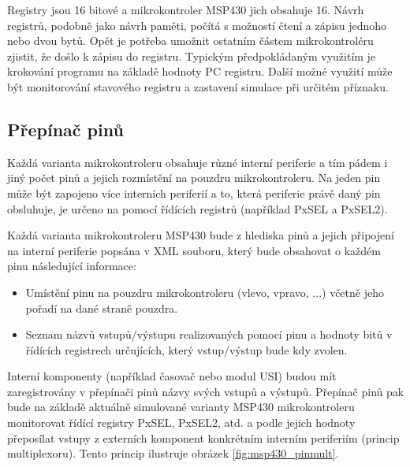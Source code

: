 Registry jsou 16 bitové a mikrokontroler MSP430 jich obsahuje 16. Návrh registrů, podobně jako návrh paměti, počítá s možností čtení a zápisu jednoho nebo dvou bytů. Opět je potřeba umožnit ostatním částem mikrokontroléru zjistit, že došlo k zápisu do registru. Typickým předpokládaným využitím je krokování
programu na základě hodnoty PC registru. Další možné využití může být monitorování stavového registru a zastavení simulace při určitém příznaku.

\subsection{Přepínač pinů}

Každá varianta mikrokontroleru obsahuje různé interní periferie a tím pádem i jiný počet pinů a jejich rozmístění na pouzdru mikrokontroleru. Na jeden pin může být zapojeno více interních periferií a to, která periferie právě daný pin obsluhuje, je určeno na pomocí řídících registrů (například PxSEL a PxSEL2).

Každá varianta mikrokontroleru MSP430 bude z hlediska pinů a jejich připojení na interní periferie popsána v XML souboru, který bude obsahovat o každém
pinu následující informace:

\begin{itemize}
\item Umístění pinu na pouzdru mikrokontroleru (vlevo, vpravo, ...) včetně jeho pořadí na dané straně pouzdra.
\item Seznam názvů vstupů/výstupu realizovaných pomocí pinu a hodnoty bitů v řídících registrech určujících, který vstup/výstup bude kdy zvolen.
\end{itemize}

Interní komponenty (například časovač nebo modul USI) budou mít zaregistrovány v přepínači pinů názvy svých vstupů a výstupů.
Přepínač pinů pak bude na základě aktuálně simulované varianty MSP430 mikrokontroleru monitorovat řídící registry PxSEL, PxSEL2, atd. a podle jejich hodnoty přeposílat vstupy z externích komponent konkrétním interním periferiím (princip multiplexoru). Tento princip ilustruje obrázek \ref{fig:msp430_pinmult}.

